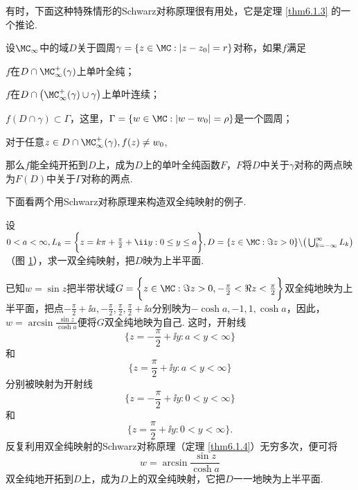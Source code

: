 有时，下面这种特殊情形的Schwarz对称原理很有用处，它是定理 \ref{thm6.1.3} 的一个推论.
\begin{theorem}\label{thm6.1.4}
设$\MC_\infty$中的域$D$关于圆周$\gamma=\{z\in\MC:|z-z_0|=r\}$对称，如果$f$满足
\begin{eenum}
  \item $f$在$D\cap\MC_\infty^+(\gamma)$上单叶全纯；
  \item $f$在$D\cap\big(\MC_\infty^+(\gamma)\cup\gamma\big)$上单叶连续；
  \item $f(D\cap\gamma)\subset\Gamma$，这里，$\Gamma=\{w\in\MC:|w-w_0|=\rho\}$是一个圆周；
  \item 对于任意$z\in D\cap\MC_\infty^+(\gamma),f(z)\ne w_0$,
\end{eenum}
那么$f$能全纯开拓到$D$上，成为$D$上的单叶全纯函数$F$，$F$将$D$中关于$\gamma$对称的两点映为$F(D)$中关于$\Gamma$对称的两点.
\end{theorem}

下面看两个用Schwarz对称原理来构造双全纯映射的例子.
\begin{example}\label{exam6.1.5}
设$0<a<\infty,L_k=\bigg\{z=k\pi+\frac\pi2+\ii y:0\le y\le a\bigg\},D=\{z\in\MC:\Im z>0\}\backslash\big(\bigcup_{k=-\infty}^\infty L_k\big)$（图 \ref{fig6.2}），求一双全纯映射，把$D$映为上半平面.
\end{example}
\begin{figure}[!ht]
\centering
{}
\caption{\label{fig6.2}}
\end{figure}
\begin{solution}
已知$w=\sin z$把半带状域$G=\bigg\{z\in\MC:\Im z>0,-\frac\pi2<\Re z<\frac\pi2\bigg\}$双全纯地映为上半平面，把点$-\frac\pi2+\ii a,-\frac\pi2,\frac\pi2,\frac\pi2+\ii a$分别映为$-\cosh a,-1,1,\cosh a$，因此，$w=\arcsin\frac{\sin z}{\cosh a}$便将$G$双全纯地映为自己. 这时，开射线
\[\bigg\{z=-\frac\pi2+\ii y:a<y<\infty\bigg\}\]
和
\[\bigg\{z=\frac\pi2+\ii y:a<y<\infty\bigg\}\]
分别被映射为开射线
\[\bigg\{z=-\frac\pi2+\ii y:0<y<\infty\bigg\}\]
和
\[\bigg\{z=\frac\pi2+\ii y:0<y<\infty\bigg\}.\]
反复利用双全纯映射的Schwarz对称原理（定理 \ref{thm6.1.4}）无穷多次，便可将
\[w=\arcsin\frac{\sin z}{\cosh a}\]
双全纯地开拓到$D$上，成为$D$上的双全纯映射，它把$D$一一地映为上半平面.
\end{solution}

